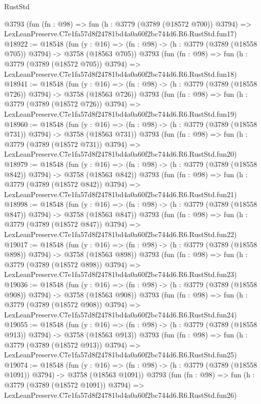 \begin{lexlean}{RustStd}
\begin{coremodule}
    @3793
    (fun (fn : @98) =>
    fun (h : @3779 (@3789 (@18572 @700)) @3794) =>
    LexLeanPreserve.C7e1fa57d8f24781bd4a0a60f2bc744d6.R6.RustStd.fun17)
@18922 := @18548
    (fun (y : @16) => (fn : @98) -> (h : @3779 (@3789 (@18558 @705)) @3794) -> @3758 (@18563 @705))
    @3793
    (fun (fn : @98) =>
    fun (h : @3779 (@3789 (@18572 @705)) @3794) =>
    LexLeanPreserve.C7e1fa57d8f24781bd4a0a60f2bc744d6.R6.RustStd.fun18)
@18941 := @18548
    (fun (y : @16) => (fn : @98) -> (h : @3779 (@3789 (@18558 @726)) @3794) -> @3758 (@18563 @726))
    @3793
    (fun (fn : @98) =>
    fun (h : @3779 (@3789 (@18572 @726)) @3794) =>
    LexLeanPreserve.C7e1fa57d8f24781bd4a0a60f2bc744d6.R6.RustStd.fun19)
@18960 := @18548
    (fun (y : @16) => (fn : @98) -> (h : @3779 (@3789 (@18558 @731)) @3794) -> @3758 (@18563 @731))
    @3793
    (fun (fn : @98) =>
    fun (h : @3779 (@3789 (@18572 @731)) @3794) =>
    LexLeanPreserve.C7e1fa57d8f24781bd4a0a60f2bc744d6.R6.RustStd.fun20)
@18979 := @18548
    (fun (y : @16) => (fn : @98) -> (h : @3779 (@3789 (@18558 @842)) @3794) -> @3758 (@18563 @842))
    @3793
    (fun (fn : @98) =>
    fun (h : @3779 (@3789 (@18572 @842)) @3794) =>
    LexLeanPreserve.C7e1fa57d8f24781bd4a0a60f2bc744d6.R6.RustStd.fun21)
@18998 := @18548
    (fun (y : @16) => (fn : @98) -> (h : @3779 (@3789 (@18558 @847)) @3794) -> @3758 (@18563 @847))
    @3793
    (fun (fn : @98) =>
    fun (h : @3779 (@3789 (@18572 @847)) @3794) =>
    LexLeanPreserve.C7e1fa57d8f24781bd4a0a60f2bc744d6.R6.RustStd.fun22)
@19017 := @18548
    (fun (y : @16) => (fn : @98) -> (h : @3779 (@3789 (@18558 @898)) @3794) -> @3758 (@18563 @898))
    @3793
    (fun (fn : @98) =>
    fun (h : @3779 (@3789 (@18572 @898)) @3794) =>
    LexLeanPreserve.C7e1fa57d8f24781bd4a0a60f2bc744d6.R6.RustStd.fun23)
@19036 := @18548
    (fun (y : @16) => (fn : @98) -> (h : @3779 (@3789 (@18558 @908)) @3794) -> @3758 (@18563 @908))
    @3793
    (fun (fn : @98) =>
    fun (h : @3779 (@3789 (@18572 @908)) @3794) =>
    LexLeanPreserve.C7e1fa57d8f24781bd4a0a60f2bc744d6.R6.RustStd.fun24)
@19055 := @18548
    (fun (y : @16) => (fn : @98) -> (h : @3779 (@3789 (@18558 @913)) @3794) -> @3758 (@18563 @913))
    @3793
    (fun (fn : @98) =>
    fun (h : @3779 (@3789 (@18572 @913)) @3794) =>
    LexLeanPreserve.C7e1fa57d8f24781bd4a0a60f2bc744d6.R6.RustStd.fun25)
@19074 := @18548
    (fun (y : @16) =>
    (fn : @98) -> (h : @3779 (@3789 (@18558 @1091)) @3794) -> @3758 (@18563 @1091))
    @3793
    (fun (fn : @98) =>
    fun (h : @3779 (@3789 (@18572 @1091)) @3794) =>
    LexLeanPreserve.C7e1fa57d8f24781bd4a0a60f2bc744d6.R6.RustStd.fun26)

\end{coremodule}
\end{lexlean}
